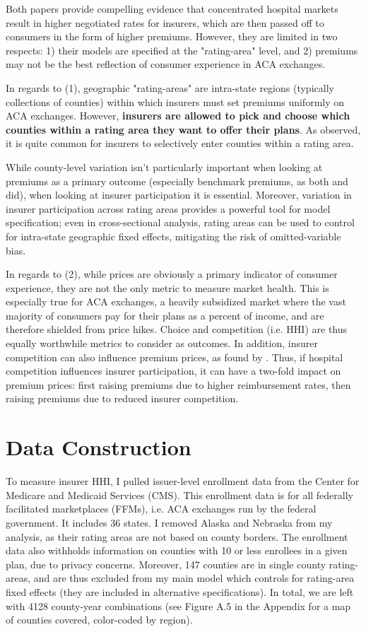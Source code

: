 \documentclass[12pt,letterpaper]{article}
\begin{document}
Both papers provide compelling evidence that concentrated hospital markets result in higher negotiated rates for insurers, which are then passed off to consumers in the form of higher premiums. However, they are limited in two respects: 1) their models are specified at the "rating-area" level, and 2) premiums may not be the best reflection of consumer experience in ACA exchanges.

In regards to (1), geographic "rating-areas" are intra-state regions (typically collections of counties) within which insurers must set premiums uniformly on ACA exchanges. However, \textbf{insurers are allowed to pick and choose which counties within a rating area they want to offer their plans}. As \citet{fang_why_2020} observed, it is quite common for insurers to selectively enter counties within a rating area.

While county-level variation isn't particularly important when looking at premiums as a primary outcome (especially benchmark premiums, as both \citet{scheffler_consolidation_2018} and \citet{boozary_association_2019} did), when looking at insurer participation it is essential. Moreover, variation in insurer participation across rating areas provides a powerful tool for model specification; even in cross-sectional analysis, rating areas can be used to control for intra-state geographic fixed effects, mitigating the risk of omitted-variable bias.

In regards to (2), while prices are obviously a primary indicator of consumer experience, they are not the only metric to measure market health. This is especially true for ACA exchanges, a heavily subsidized market where the vast majority of consumers pay for their plans as a percent of income, and are therefore shielded from price hikes. Choice and competition (i.e. HHI) are thus equally worthwhile metrics to consider as outcomes. In addition, insurer competition can also influence premium prices, as found by \citet{scheffler_consolidation_2018}.  Thus, if hospital competition influences insurer participation, it can have a two-fold impact on premium prices: first raising premiums due to higher reimbursement rates, then raising premiums due to reduced insurer competition. 

\section{Data Construction}
To measure insurer HHI, I pulled issuer-level enrollment data from the Center for Medicare and Medicaid Services (CMS). This enrollment data is for all federally facilitated marketplaces (FFMs), i.e. ACA exchanges run by the federal government. It includes 36 states. I removed Alaska and Nebraska from my analysis, as their rating areas are not based on county borders. The enrollment data also withholds information on counties with 10 or less enrollees in a given plan, due to privacy concerns. Moreover, 147 counties are in single county rating-areas, and are thus excluded from my main model which controls for rating-area fixed effects (they are included in alternative specifications). In total, we are left with 4128 county-year combinations (see Figure A.5 in the Appendix for a map of counties covered, color-coded by region). 
\end{document}

